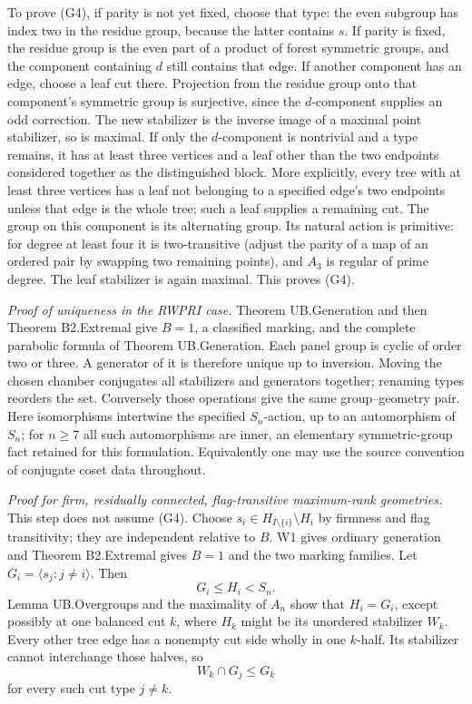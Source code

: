 To prove (G4), if parity is not yet fixed, choose that type: the even subgroup has index two in the residue group, because the latter contains \(s\). If parity is fixed, the residue group is the even part of a product of forest symmetric groups, and the component containing \(d\) still contains that edge. If another component has an edge, choose a leaf cut there. Projection from the residue group onto that component's symmetric group is surjective, since the \(d\)-component supplies an odd correction. The new stabilizer is the inverse image of a maximal point stabilizer, so is maximal. If only the \(d\)-component is nontrivial and a type remains, it has at least three vertices and a leaf other than the two endpoints considered together as the distinguished block. More explicitly, every tree with at least three vertices has a leaf not belonging to a specified edge's two endpoints unless that edge is the whole tree; such a leaf supplies a remaining cut. The group on this component is its alternating group. Its natural action is primitive: for degree at least four it is two-transitive (adjust the parity of a map of an ordered pair by swapping two remaining points), and \(A_3\) is regular of prime degree. The leaf stabilizer is again maximal. This proves (G4).

\emph{Proof of uniqueness in the RWPRI case.} Theorem UB.Generation and then Theorem B2.Extremal give \(B=1\), a classified marking, and the complete parabolic formula of Theorem UB.Generation. Each panel group is cyclic of order two or three. A generator of it is therefore unique up to inversion. Moving the chosen chamber conjugates all stabilizers and generators together; renaming types reorders the set. Conversely those operations give the same group--geometry pair. Here isomorphisms intertwine the specified \(S_n\)-action, up to an automorphism of \(S_n\); for \(n\geq7\) all such automorphisms are inner, an elementary symmetric-group fact retained for this formulation. Equivalently one may use the source convention of conjugate coset data throughout.

\emph{Proof for firm, residually connected, flag-transitive maximum-rank geometries.} This step does not assume (G4). Choose \(s_i\in H_{I\setminus\{i\}}\setminus H_i\) by firmness and flag transitivity; they are independent relative to \(B\). W1 gives ordinary generation and Theorem B2.Extremal gives \(B=1\) and the two marking families. Let \(G_i=\langle s_j:j\ne i\rangle\). Then \[
G_i\leq H_i<S_n.
\] Lemma UB.Overgroups and the maximality of \(A_n\) show that \(H_i=G_i\), except possibly at one balanced cut \(k\), where \(H_k\) might be its unordered stabilizer \(W_k\). Every other tree edge has a nonempty cut side wholly in one \(k\)-half. Its stabilizer cannot interchange those halves, so \begin{equation}
W_k\cap G_j\leq G_k
\label{eq:maximal-symmetric-markings:5-1}
\end{equation} for every such cut type \(j\ne k\).

